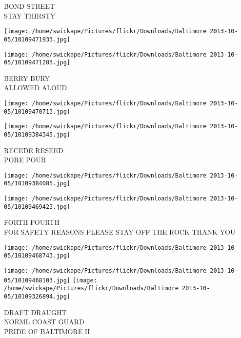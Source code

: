 \documentclass[10pt,letterpaper]{article}
\begin{document}
BOND STREET\\
STAY THIRSTY
\pagebreak

\texttt{[image: /home/swickape/Pictures/flickr/Downloads/Baltimore 2013-10-05/10109471933.jpg]}

\vspace{0.25in}
\texttt{[image: /home/swickape/Pictures/flickr/Downloads/Baltimore 2013-10-05/10109471283.jpg]}

BERRY BURY\\
ALLOWED ALOUD
\pagebreak

\texttt{[image: /home/swickape/Pictures/flickr/Downloads/Baltimore 2013-10-05/10109470713.jpg]}

\vspace{0.25in}
\texttt{[image: /home/swickape/Pictures/flickr/Downloads/Baltimore 2013-10-05/10109384345.jpg]}

RECEDE RESEED\\
PORE POUR
\pagebreak

\texttt{[image: /home/swickape/Pictures/flickr/Downloads/Baltimore 2013-10-05/10109384085.jpg]}

\vspace{0.25in}
\texttt{[image: /home/swickape/Pictures/flickr/Downloads/Baltimore 2013-10-05/10109469423.jpg]}

FORTH FOURTH\\
FOR SAFETY REASONS PLEASE STAY OFF THE ROCK THANK YOU
\pagebreak

\texttt{[image: /home/swickape/Pictures/flickr/Downloads/Baltimore 2013-10-05/10109468743.jpg]}

\vspace{0.25in}
\texttt{[image: /home/swickape/Pictures/flickr/Downloads/Baltimore 2013-10-05/10109468103.jpg]}
\texttt{[image: /home/swickape/Pictures/flickr/Downloads/Baltimore 2013-10-05/10109326894.jpg]}

DRAFT DRAUGHT\\
NORML COAST GUARD\\
PRIDE OF BALTIMORE II
\pagebreak
\end{document}
